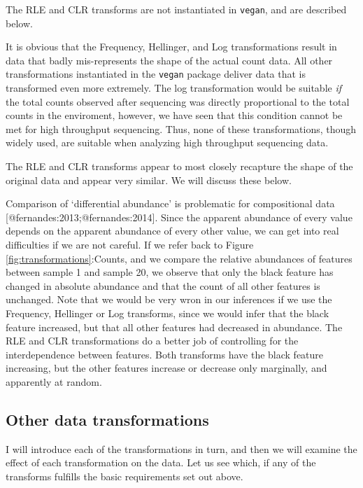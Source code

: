 \documentclass[
  onecolumn]{article}
\begin{document}
The RLE and CLR transforms are not instantiated in \texttt{vegan}, and are described below.

It is obvious that the Frequency, Hellinger, and Log transformations result in data that badly mis-represents the shape of the actual count data. All other transformations instantiated in the \texttt{vegan} package deliver data that is transformed even more extremely. The log transformation would be suitable \emph{if} the total counts observed after sequencing was directly proportional to the total counts in the enviroment, however, we have seen that this condition cannot be met for high throughput sequencing. Thus, none of these transformations, though widely used, are suitable when analyzing high throughput sequencing data.

The RLE and CLR transforms appear to most closely recapture the shape of the original data and appear very similar. We will discuss these below.

Comparison of `differential abundance' is problematic for compositional data {[}@fernandes:2013;@fernandes:2014{]}. Since the apparent abundance of every value depends on the apparent abundance of every other value, we can get into real difficulties if we are not careful. If we refer back to Figure \ref{fig:transformations}:Counts, and we compare the relative abundances of features between sample 1 and sample 20, we observe that only the black feature has changed in absolute abundance and that the count of all other features is unchanged. Note that we would be very wron in our inferences if we use the Frequency, Hellinger or Log transforms, since we would infer that the black feature increased, but that all other features had decreased in abundance. The RLE and CLR transformations do a better job of controlling for the interdependence between features. Both transforms have the black feature increasing, but the other features increase or decrease only marginally, and apparently at random.

\hypertarget{other-data-transformations}{%
\subsection{Other data transformations}\label{other-data-transformations}}

I will introduce each of the transformations in turn, and then we will examine the effect of each transformation on the data. Let us see which, if any of the transforms fulfills the basic requirements set out above.
\end{document}

